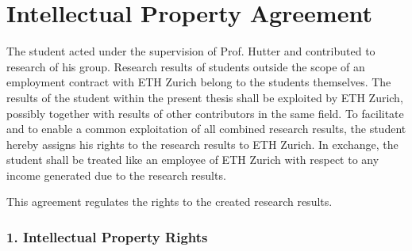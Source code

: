 
\section{Intellectual Property Agreement}


The student acted under the supervision of Prof. Hutter and contributed to research of his group.
Research results of students outside the scope of an employment contract with ETH Zurich belong to the students themselves.
The results of the student within the present thesis shall be exploited by ETH Zurich, possibly together with results of other contributors in the same field.
To facilitate and to enable a common exploitation of all combined research results, the student hereby assigns his rights to the research results to ETH Zurich.
In exchange, the student shall be treated like an employee of ETH Zurich with respect to any income generated due to the research results.

This agreement regulates the rights to the created research results.



\subsubsection{1. Intellectual Property Rights} 

